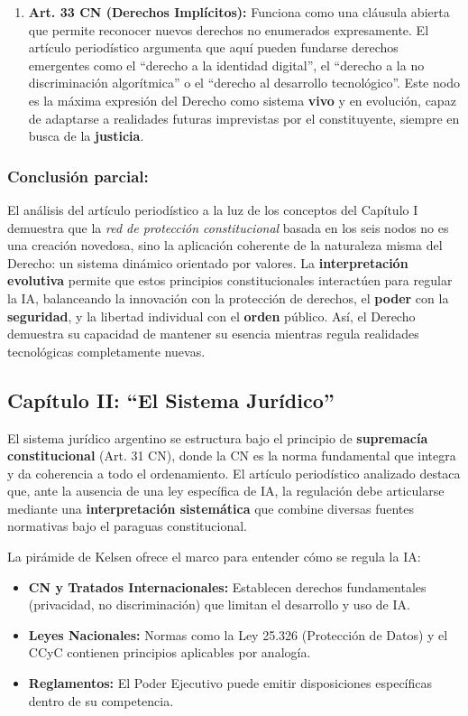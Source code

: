 \documentclass[10pt, a4paper]{article}
\begin{document}
\begin{enumerate}
    \item \textbf{Art. 33 CN (Derechos Implícitos):} Funciona como una cláusula abierta que permite reconocer nuevos derechos no enumerados expresamente. El artículo periodístico argumenta que aquí pueden fundarse derechos emergentes como el ``derecho a la identidad digital'', el ``derecho a la no discriminación algorítmica'' o el ``derecho al desarrollo tecnológico''. Este nodo es la máxima expresión del Derecho como sistema \textbf{vivo} y en evolución, capaz de adaptarse a realidades futuras imprevistas por el constituyente, siempre en busca de la \textbf{justicia}.
\end{enumerate}

\subsubsection*{Conclusión parcial:}
El análisis del artículo periodístico a la luz de los conceptos del Capítulo I demuestra que la \emph{red de protección constitucional} basada en los seis nodos no es una creación novedosa, sino la aplicación coherente de la naturaleza misma del Derecho: un sistema dinámico orientado por valores. La \textbf{interpretación evolutiva} permite que estos principios constitucionales interactúen para regular la IA, balanceando la innovación con la protección de derechos, el \textbf{poder} con la \textbf{seguridad}, y la libertad individual con el \textbf{orden} público. Así, el Derecho demuestra su capacidad de mantener su esencia mientras regula realidades tecnológicas completamente nuevas.

\subsection{Capítulo II: ``El Sistema Jurídico''}
\label{subsec:sistema}

El sistema jurídico argentino se estructura bajo el principio de \textbf{supremacía constitucional} (Art. 31 CN), donde la CN \parencite{constitucion} es la norma fundamental que integra y da coherencia a todo el ordenamiento. El artículo periodístico analizado destaca que, ante la ausencia de una ley específica de IA, la regulación debe articularse mediante una \textbf{interpretación sistemática} que combine diversas fuentes normativas bajo el paraguas constitucional.

La pirámide de Kelsen ofrece el marco para entender cómo se regula la IA:
\begin{itemize}
    \item \textbf{CN y Tratados Internacionales:} Establecen derechos fundamentales (privacidad, no discriminación) que limitan el desarrollo y uso de IA.
    \item \textbf{Leyes Nacionales:} Normas como la Ley 25.326 (Protección de Datos) y el CCyC contienen principios aplicables por analogía.
    \item \textbf{Reglamentos:} El Poder Ejecutivo puede emitir disposiciones específicas dentro de su competencia.
\end{itemize}
\end{document}
